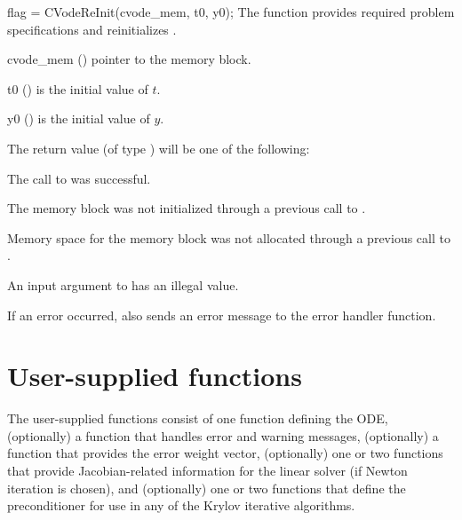 {
  flag = CVodeReInit(cvode\_mem, t0, y0);
}
{
  The function  provides required problem specifications 
  and reinitializes {\cvode}.
}
{
  \begin{args}
  \item[cvode\_mem] ()
    pointer to the {\cvode} memory block.
  \item[t0] ()
    is the initial value of $t$.
  \item[y0] ()
    is the initial value of $y$. 
  \end{args}
}
{
  The return value  (of type ) will be one of the following:
  \begin{args}[CV\_NO\_MALLOC]
  \item[\Id{CV\_SUCCESS}]
    The call to  was successful.
  \item[\Id{CV\_MEM\_NULL}] 
    The {\cvode} memory block was not initialized through a 
    previous call to .
  \item[\Id{CV\_NO\_MALLOC}] 
    Memory space for the {\cvode} memory block was not allocated through a 
    previous call to .
  \item[\Id{CV\_ILL\_INPUT}] 
    An input argument to  has an illegal value.
  \end{args}
}
{
  If an error occurred,  also sends an error message to the
  error handler function.
}


\section{User-supplied functions}\label{ss:user_fct_sim}

The user-supplied functions consist of one function defining the ODE, 
(optionally) a function that handles error and warning messages, 
(optionally) a function that provides the error weight vector, 
(optionally) one or two functions that provide Jacobian-related
information for the linear solver (if Newton iteration is chosen), and
(optionally) one or two functions that define the preconditioner for
use in any of the Krylov iterative algorithms.

